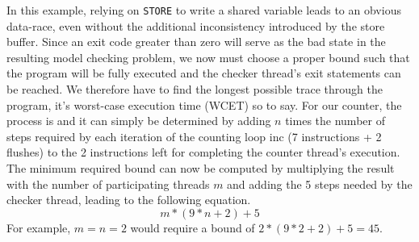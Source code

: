 In this example, relying on \lstinline[style=asm]{STORE} to write a shared variable leads to an obvious data-race, even without the additional inconsistency introduced by the store buffer.
Since an exit code greater than zero will serve as the bad state in the resulting model checking problem, we now must choose a proper bound
such that the program will be fully executed
and the checker thread's exit statements can be reached.
We therefore have to find the longest possible trace through the program, it's worst-case execution time (WCET) so to say.
For our  counter, the process is  and it can simply be determined by adding $n$ times the number of steps required by each iteration of the counting loop {\color{red!60!black}\textsf{inc}} (7 instructions + 2 flushes) to the 2 instructions left for completing the counter thread's execution.
The minimum required bound can now be computed by multiplying the result with the number of participating threads $m$ and adding the 5 steps needed by the checker thread, leading to the following equation.
\[
  m * (9 * n + 2) + 5
\]
For example, $m = n = 2$ would require a bound of $2 * (9 * 2 + 2) + 5 = 45$.

